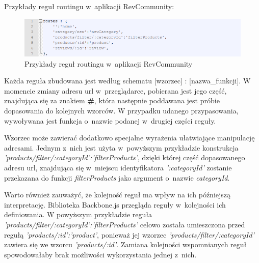 Przykłady reguł routingu w~aplikacji RevCommunity:

\begin{figure}[H]
	\centering
	\includegraphics[width=\textwidth]{images/routes.png}
	\caption{Przykłady reguł routingu w~aplikacji RevCommunity}
\end{figure}

Każda reguła zbudowana jest według schematu [wzorzec] : [nazwa\_funkcji]. W momencie zmiany adresu url w~przeglądarce, pobierana jest jego część, znajdująca się za znakiem \textbf{\#}, która następnie poddawana jest próbie dopasowania do kolejnych wzorców. W przypadku udanego przypasowania, wywoływana jest funkcja o~nazwie podanej w~drugiej części reguły.

Wzorzec może zawierać dodatkowo specjalne wyrażenia ułatwiające manipulację adresami. Jednym z~nich jest użyta w~powyższym przykładzie konstrukcja \newline \textit{'products/filter/:categoryId':'filterProducts'}, dzięki której część dopasowanego adresu url, znajdująca się w~miejscu identyfikatora \textit{':categoryId'} zostanie przekazana do funkcji \textit{filterProducts} jako argument o~nazwie \textit{categoryId}.

Warto również zauważyć, że kolejność reguł ma wpływ na ich późniejszą interpretację. Biblioteka Backbone.js przegląda reguły w~kolejności ich definiowania. W powyższym przykładzie reguła \textit{'products/filter/:categoryId':'filterProducts'} celowo została umieszczona przed regułą \textit{'products/:id':'product'}, ponieważ jej wzorzec \textit{'products/filter/:categoryId'} zawiera się we wzorcu \textit{'products/:id'}. Zamiana kolejności wspomnianych reguł spowodowałaby brak możliwości wykorzystania jednej z~nich.\cite{backbone}